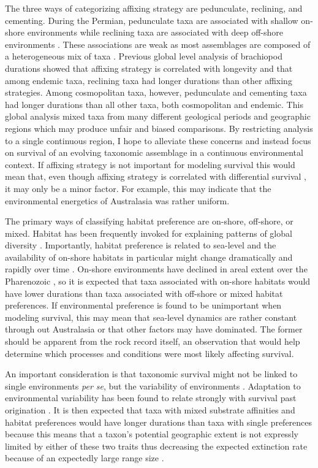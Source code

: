 \documentclass[12pt,letterpaper]{article}
\begin{document}
The three ways of categorizing affixing strategy are pedunculate, reclining, and cementing. During the Permian, pedunculate taxa are associated with shallow on-shore environments while reclining taxa are associated with deep off-shore environments \citep{Clapham2007}. These associations are weak as most assemblages are composed of a heterogeneous mix of taxa \citep{Clapham2007}. Previous global level analysis of brachiopod durations showed that affixing strategy is correlated with longevity \citep{Alexander1977} and that among endemic taxa, reclining taxa had longer durations than other affixing strategies. Among cosmopolitan taxa, however, pedunculate and cementing taxa had longer durations than all other taxa, both cosmopolitan and endemic. This global analysis mixed taxa from many different geological periods and geographic regions which may produce unfair and biased comparisons. By restricting analysis to a single continuous region, I hope to alleviate these concerns and instead focus on survival of an evolving taxonomic assemblage in a continuous environmental context. If affixing strategy is not important for modeling survival this would mean that, even though affixing strategy is correlated with differential survival \citep{Alexander1977}, it may only be a minor factor. For example, this may indicate that the environmental energetics of Australasia was rather uniform. 

The primary ways of classifying habitat preference are on-shore, off-shore, or mixed. Habitat has been frequently invoked for explaining patterns of global diversity \citep{Sepkoski1991,Kiessling2007a,Bottjer1988,Jablonski1991,Jablonski1983b}. Importantly, habitat preference is related to sea-level and the availability of on-shore habitats in particular might change dramatically and rapidly over time \citep{Olszewski2004}. On-shore environments have declined in areal extent over the Pharenozoic \citep{Peters2008}, so it is expected that taxa associated with on-shore habitats would have lower durations than taxa associated with off-shore or mixed habitat preferences. If environmental preference is found to be unimportant when modeling survival, this may mean that sea-level dynamics are rather constant through out Australasia or that other factors may have dominated. The former should be apparent from the rock record itself, an observation that would help determine which processes and conditions were most likely affecting survival.

An important consideration is that taxonomic survival might not be linked to single environments \textit{per se}, but the variability of environments \citep{Foote2013,Heim2011,Liow2007b}. Adaptation to environmental variability has been found to relate strongly with survival past origination \citep{Foote2013}. It is then expected that taxa with mixed substrate affinities and habitat preferences would have longer durations than taxa with single preferences because this means that a taxon's potential geographic extent is not expressly limited by either of these two traits thus decreasing the expected extinction rate because of an expectedly large range size \citep{Jablonski1986,Harnik2013,Nurnberg2013a,Jablonski2003,Roy2009c}. 
\end{document}
